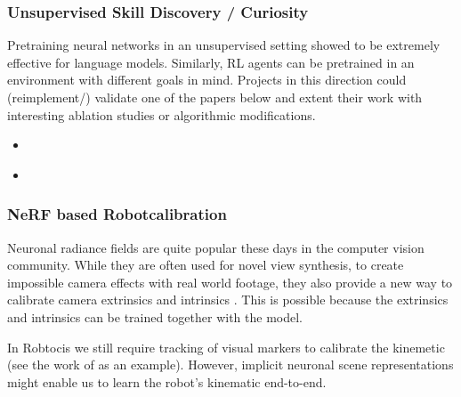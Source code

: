 \documentclass[a4paper]{article}
\begin{document}
\subsubsection{Unsupervised Skill Discovery / Curiosity}
Pretraining neural networks in an unsupervised setting showed to be extremely effective for language models. Similarly, RL agents can be pretrained in an environment with different goals in mind. Projects in this direction could (reimplement/) validate one of the papers below and extent their work with interesting ablation studies or algorithmic modifications.
\begin{itemize}
  \item \cite{Plan2Explore2020}
  \item \cite{DADS2020}
\end{itemize}


\subsubsection{NeRF based Robotcalibration}
Neuronal radiance fields are quite popular these days in the computer vision community. While they are often used for novel view synthesis, to create impossible camera effects with real world footage, they also provide a new way to calibrate camera extrinsics and intrinsics \cite{lin2021barf, Sucar:etal:ICCV2021, wang2021nerfmm, SCNeRF2021}.
This is possible because the extrinsics and intrinsics can be trained together with the model.

In Robtocis we still require tracking of visual markers to calibrate the kinemetic (see the work of \cite{Birbach2014} as an example). However, implicit neuronal scene representations might enable us to learn the robot's kinematic end-to-end.
\end{document}

